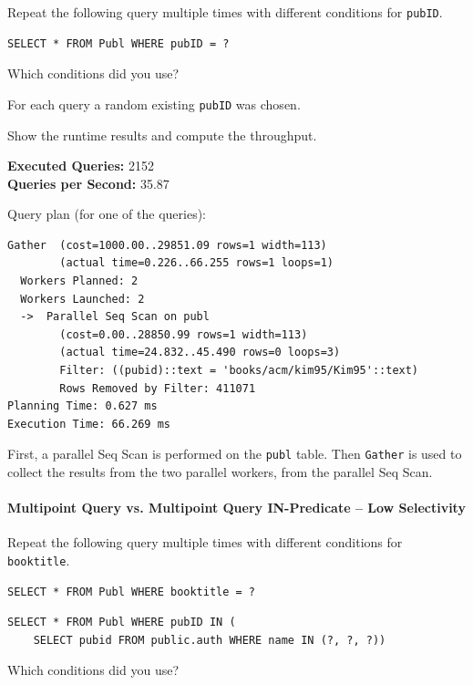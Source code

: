 \documentclass[11pt]{scrartcl}
\begin{document}
Repeat the following query multiple times with different conditions for \texttt{pubID}.

\begin{lstlisting}[style=dbtsql]
SELECT * FROM Publ WHERE pubID = ?
\end{lstlisting}

Which conditions did you use?

For each query a random existing \texttt{pubID} was chosen.

Show the runtime results and compute the throughput.

\textbf{Executed Queries: } 2152\\
\textbf{Queries per Second: } 35.87

Query plan (for one of the queries):

{\small
\parskip0pt\begin{verbatim}
Gather  (cost=1000.00..29851.09 rows=1 width=113)
        (actual time=0.226..66.255 rows=1 loops=1)
  Workers Planned: 2
  Workers Launched: 2
  ->  Parallel Seq Scan on publ
        (cost=0.00..28850.99 rows=1 width=113)
        (actual time=24.832..45.490 rows=0 loops=3)
        Filter: ((pubid)::text = 'books/acm/kim95/Kim95'::text)
        Rows Removed by Filter: 411071
Planning Time: 0.627 ms
Execution Time: 66.269 ms
\end{verbatim}}

First, a parallel Seq Scan is performed on the \texttt{publ} table.
Then \texttt{Gather} is used to collect the results from the two parallel workers, from the parallel Seq Scan.
\cite{ParallelQueryDocumentation2024}

\paragraph{Multipoint Query vs. Multipoint Query IN-Predicate -- Low Selectivity}

Repeat the following query multiple times with different conditions for \texttt{booktitle}.

\begin{lstlisting}[style=dbtsql]
SELECT * FROM Publ WHERE booktitle = ?
\end{lstlisting}

\begin{lstlisting}[style=dbtsql]
SELECT * FROM Publ WHERE pubID IN (
    SELECT pubid FROM public.auth WHERE name IN (?, ?, ?))
\end{lstlisting}

Which conditions did you use?
\end{document}
